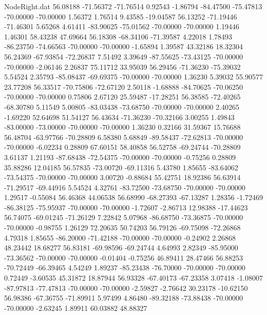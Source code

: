 \begin{filecontents}{NodeRight.dat}
  56.08188  -71.56372  -71.76514     0.92543   -1.86794  -84.47500  -75.47813  -70.00000  -70.00000    1.56372    1.76514    9.43585  -19.04587
  56.13252  -71.19446  -71.46301     5.65268    4.61411  -83.90625  -75.01562  -70.00000  -70.00000    1.19446    1.46301   58.43238   47.69664
  56.18308  -68.34106  -71.39587     4.22018    1.78493  -86.23750  -74.66563  -70.00000  -70.00000   -1.65894    1.39587   43.32186   18.32304
  56.24369  -67.93854  -72.26837     7.51492    3.39649  -87.55625  -73.43125  -70.00000  -70.00000   -2.06146    2.26837   75.11712   33.95039
  56.29456  -71.36230  -75.39032     5.54524    2.35793  -85.08437  -69.69375  -70.00000  -70.00000    1.36230    5.39032   55.90577   23.77208
  56.33517  -70.75806  -72.67120     2.50118   -1.68888  -84.70625  -70.06250  -70.00000  -70.00000    0.75806    2.67120   25.59487  -17.28251
  56.38585  -72.40265  -68.30780     5.11549    5.00805  -83.03438  -73.68750  -70.00000  -70.00000    2.40265   -1.69220   52.64698   51.54127
  56.43634  -71.36230  -70.32166     3.00255    1.49843  -83.00000  -73.00000  -70.00000  -70.00000    1.36230    0.32166   31.59367   15.76688
  56.48704  -63.97766  -70.28809     6.58380    5.68849  -89.58437  -72.62813  -70.00000  -70.00000   -6.02234    0.28809   67.60151   58.40858
  56.52758  -69.24744  -70.28809     3.61137    1.21193  -87.68438  -72.54375  -70.00000  -70.00000   -0.75256    0.28809   35.88286   12.04185
  56.57835  -73.00720  -69.11316     5.43780    1.85655  -83.64062  -73.54375  -70.00000  -70.00000    3.00720   -0.88684   55.42751   18.92386
  56.63914  -71.29517  -69.44916     5.54524    4.32761  -83.72500  -73.68750  -70.00000  -70.00000    1.29517   -0.55084   56.46368   44.06538
  56.68990  -68.27393  -67.13287     1.28356   -1.72469  -86.38125  -75.95937  -70.00000  -70.00000   -1.72607   -2.86713   12.98388  -17.44623
  56.74075  -69.01245  -71.26129     7.22842    5.07968  -86.68750  -73.36875  -70.00000  -70.00000   -0.98755    1.26129   72.20635   50.74203
  56.79126  -69.75098  -72.26868     4.79318    1.85655  -86.20000  -71.42188  -70.00000  -70.00000   -0.24902    2.26868   48.23442   18.68277
  56.83181  -69.98596  -69.24744     4.64993    2.82349  -85.95000  -73.36562  -70.00000  -70.00000   -0.01404   -0.75256   46.89411   28.47466
  56.88253  -70.72449  -66.39465     4.54249    1.89237  -85.23438  -76.70000  -70.00000  -70.00000    0.72449   -3.60535   45.31872   18.87944
  56.93328  -67.40173  -67.23358     3.07418   -1.08007  -87.97813  -77.47813  -70.00000  -70.00000   -2.59827   -2.76642   30.23178  -10.62150
  56.98386  -67.36755  -71.89911     5.97499    4.86480  -89.32188  -73.88438  -70.00000  -70.00000   -2.63245    1.89911   60.03882   48.88327

\end{filecontents}
